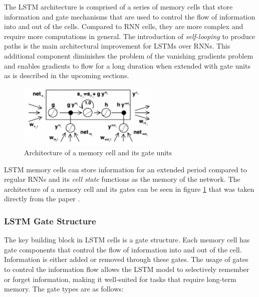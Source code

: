             The LSTM architecture is comprised of a series of memory cells that store information and gate mechanisms that are used to control the flow of information into and out of the cells.
            Compared to RNN cells, they are more complex and require more computations in general.
            The introduction of \emph{self-looping} to produce paths is the main architectural improvement for LSTMs over RNNs. This additional component diminishes the problem of the vanishing gradients problem and enables gradients to flow for a long duration when extended with gate units as is described in the upcoming sections.
            \begin{figure}[h!]
                \centering
                \includegraphics[width=0.6\textwidth]{figures/lstm_memory_cell.png}
                \caption{Architecture of a memory cell and its gate units \cite{hochreiterLongShortTermMemory1997}}
                \label{fig:architecture-of-a-memory-cell}
            \end{figure}
            LSTM memory cells can store information for an extended period compared to regular RNNs and its \emph{cell state} functions as the memory of the network.
            The architecture of a memory cell and its gates can be seen in figure \ref{fig:architecture-of-a-memory-cell} that was taken directly from the paper \cite{hochreiterLongShortTermMemory1997}.


            \subsubsection{LSTM Gate Structure}
            \label{sec:lstm-gate-structure}

                The key building block in LSTM cells is a gate structure.
                Each memory cell has gate components that control the flow of information into and out of the cell.
                Information is either added or removed through these gates.
                The usage of gates to control the information flow allows the LSTM model to selectively remember or forget information, making it well-suited for tasks that require long-term memory.
                The gate types are as follows:

